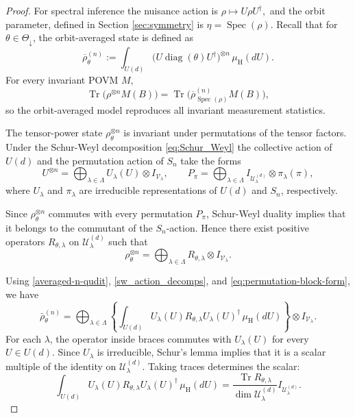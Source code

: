 \documentclass{article}
\theoremstyle{named}
\theoremstyle{named1}
\newcommand{\Tr}{\operatorname{Tr}}
\newcommand{\diag}{\operatorname{diag}}
\newcommand{\Haar}{\mu_{\mathrm H}}
\newcommand{\spec}{\operatorname{Spec}}
\theoremstyle{plain}
\theoremstyle{remark}
\begin{document}
\begin{proof}

For spectral inference the nuisance action is
\(
    \rho\mapsto U\rho U^\dagger,
\)
and the orbit parameter, defined in Section \ref{sec:symmetry} is
\(
    \eta=\spec(\rho).
\)
Recall that for $\theta\in\Theta_{\downarrow}$,  the orbit-averaged state is defined as
\begin{equation}
    \overline\rho_{\theta}^{(n)}
    :=
    \int_{U(d)}
    \bigl(U\diag(\theta)U^{\dagger}\bigr)^{\otimes n}
    \,\Haar(dU). \label{averaged-n-qudit}
\end{equation}
For every invariant POVM $M$,
\[
    \Tr\bigl(\rho^{\otimes n}M(B)\bigr)
    =
    \Tr\bigl(
        \overline\rho_{\spec(\rho)}^{(n)}M(B)
    \bigr),
\]
so the orbit-averaged model reproduces all invariant measurement statistics.


The tensor-power state $\rho_\theta^{\otimes n}$ is invariant under
permutations of the tensor factors.  Under the Schur-Weyl decomposition \eqref{eq:Schur_Weyl}
the collective action of $U(d)$ and the permutation action of $S_n$ take
the forms
\begin{equation}
    U^{\otimes n}
    =
    \bigoplus_{\lambda\in\Lambda}
    U_\lambda(U)\otimes I_{\mathcal V_\lambda},
    \qquad
    P_\pi
    =
    \bigoplus_{\lambda\in\Lambda}
    I_{\mathcal U_\lambda^{(d)}}\otimes\pi_\lambda(\pi), \label{sw_action_decomps}
\end{equation}
where $U_\lambda$ and $\pi_\lambda$ are irreducible representations of
$U(d)$ and $S_n$, respectively.

Since $\rho_\theta^{\otimes n}$ commutes with every permutation $P_\pi$,
Schur-Weyl duality implies that it belongs to the commutant of the
$S_n$-action.  Hence there exist positive operators
$R_{\theta,\lambda}$ on $\mathcal U_\lambda^{(d)}$ such that
\begin{equation}
    \rho_\theta^{\otimes n}
    =
    \bigoplus_{\lambda\in\Lambda}
    R_{\theta,\lambda}
    \otimes
    I_{\mathcal V_\lambda}.
    \label{eq:permutation-block-form}
\end{equation}


Using \eqref{averaged-n-qudit}, \eqref{sw_action_decomps}, and \eqref{eq:permutation-block-form}, we have
\[
    \bar\rho_\theta^{(n)}
    =
    \bigoplus_{\lambda\in\Lambda}
    \left\{
        \int_{U(d)}
        U_\lambda(U)
        R_{\theta,\lambda}
        U_\lambda(U)^\dagger\,
        \Haar(dU)
    \right\}
    \otimes
    I_{\mathcal V_\lambda}.
\]
For each $\lambda$, the operator inside braces commutes with
$U_\lambda(U)$ for every $U\in U(d)$.  Since $U_\lambda$ is irreducible,
Schur's lemma implies that it is a scalar multiple of the identity on
$\mathcal U_\lambda^{(d)}$.  Taking traces determines the scalar:
\[
    \int_{U(d)}
    U_\lambda(U)
    R_{\theta,\lambda}
    U_\lambda(U)^\dagger\,
    \Haar(dU)
    =
    \frac{\Tr R_{\theta,\lambda}}
         {\dim\mathcal U_\lambda^{(d)}}
    I_{\mathcal U_\lambda^{(d)}}.
\]


\end{proof}
\end{document}

